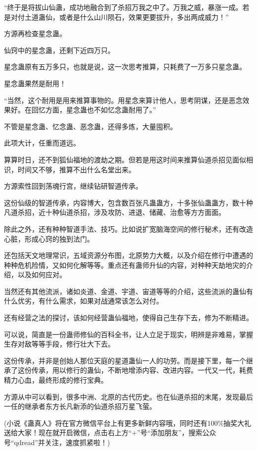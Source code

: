 \begin{this_body}
“终于是将拔山仙蛊，成功地融合到了杀招万我之中了。万我之威，暴涨一成。若是对付土道蛊仙，或者是什么山川陨石，效果更要拔升，多出两成威力！”

方源再检查星念蛊。

仙窍中的星念蛊，还剩下近四万只。

星念蛊原有五万多只，也就是说，这一次思考推算，只耗费了一万多只星念蛊。

星念蛊果然是耐用！

“当然，这个耐用是用来推算事物的。用星念来算计他人，思考阴谋，还是恶念效果好。在回忆方面，星念蛊也不如忆念蛊耐用了。”

不管是星念蛊、忆念蛊、恶念蛊，还得多炼，大量囤积。

此项大计，任重而道远。

算算时日，还不到狐仙福地的渡劫之期。但若是用这时间来推算仙道杀招见面似相识，时间又不够，推算不出什么名堂出来。

方源索性回到荡魂行宫，继续钻研智道传承。

这份仙级的智道传承，内容博大，包含数百张凡蛊蛊方，十多张仙蛊蛊方，数十种凡道杀招，近十种仙道杀招，涉及攻防、进退、储藏、治愈等方方面面。

除此之外，还有种种智道手法、技巧。比如说扩宽脑海空间的修行秘术，还有改造心脏，形成心窍的独到法门。

还包括天文地理常识，五域资源分布图，北原势力大概，以及介绍在修行中遭遇的种种危机险情，又如何化解等等。重点还有蛊师升仙的内容，对种种天劫地灾的介绍，以及如何应对。

当然还有其他流派，诸如炎道、金道、宇道、宙道等等的介绍，这些流派的蛊仙有什么优劣，有什么需求，如果对战通常该怎么对付。

还有经营之法的探讨，该如何经营蛊仙福地，使得自己生存下去，修为不断精进。

可以说，简直是一份蛊师修仙的百科全书，让人立足于现实，明辨是非难易，掌握生存对敌等等手段，修行壮大下去。

这份传承，并非是创始人那位天庭的星道蛊仙一人的功劳。而是接下里，每一个继承了这份传承，用以修行的蛊仙，不断地增添内容、改进内容。一代又一代，耗费精力心血，最终形成的修行宝典。

方源从中可以看到，很多中洲、北原的古代历史。也在仙道杀招的末尾，发现最后一任的继承者东方长凡新添的仙道杀招万星飞萤。

(小说《蛊真人》将在官方微信平台上有更多新鲜内容哦，同时还有100\%抽奖大礼送给大家！现在就开启微信，点击右上方“+”号“添加朋友”，搜索公众号“qdread”并关注，速度抓紧啦！)

\end{this_body}

